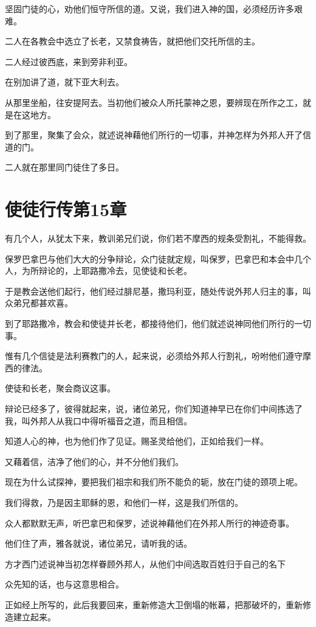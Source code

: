 \documentclass[12pt,oneside]{book}
\begin{document}
坚固门徒的心，劝他们恒守所信的道。又说，我们进入神的国，必须经历许多艰难。

二人在各教会中选立了长老，又禁食祷告，就把他们交托所信的主。

二人经过彼西底，来到旁非利亚。

在别加讲了道，就下亚大利去。

从那里坐船，往安提阿去。当初他们被众人所托蒙神之恩，要辨现在所作之工，就是在这地方。

到了那里，聚集了会众，就述说神藉他们所行的一切事，并神怎样为外邦人开了信道的门。

二人就在那里同门徒住了多日。

\chapter{使徒行传第15章}
有几个人，从犹太下来，教训弟兄们说，你们若不摩西的规条受割礼，不能得救。

保罗巴拿巴与他们大大的分争辩论，众门徒就定规，叫保罗，巴拿巴和本会中几个人，为所辩论的，上耶路撒冷去，见使徒和长老。

于是教会送他们起行，他们经过腓尼基，撒玛利亚，随处传说外邦人归主的事，叫众弟兄都甚欢喜。

到了耶路撒冷，教会和使徒并长老，都接待他们，他们就述说神同他们所行的一切事。

惟有几个信徒是法利赛教门的人，起来说，必须给外邦人行割礼，吩咐他们遵守摩西的律法。

使徒和长老，聚会商议这事。

辩论已经多了，彼得就起来，说，诸位弟兄，你们知道神早已在你们中间拣选了我，叫外邦人从我口中得听福音之道，而且相信。

知道人心的神，也为他们作了见证。赐圣灵给他们，正如给我们一样。

又藉着信，洁净了他们的心，并不分他们我们。

现在为什么试探神，要把我们祖宗和我们所不能负的轭，放在门徒的颈项上呢。

我们得救，乃是因主耶稣的恩，和他们一样，这是我们所信的。

众人都默默无声，听巴拿巴和保罗，述说神藉他们在外邦人所行的神迹奇事。

他们住了声，雅各就说，诸位弟兄，请听我的话。

方才西门述说神当初怎样眷顾外邦人，从他们中间选取百姓归于自己的名下

众先知的话，也与这意思相合。

正如经上所写的，此后我要回来，重新修造大卫倒塌的帐幕，把那破坏的，重新修造建立起来。
\end{document}
